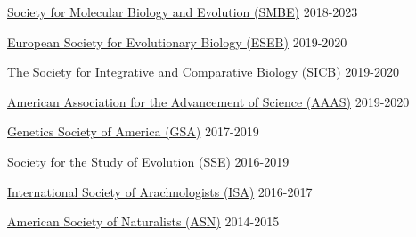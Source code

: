 

\begin{cvmemberships}

  \cvmembership
    {\href{https://smbe.org/}{Society for Molecular Biology and Evolution (SMBE)}} %
    {} %
    {2018-2023} %
    
  \cvmembership
    {\href{https://eseb.org/}{European Society for Evolutionary Biology (ESEB)}}
    {}
    {2019-2020}
  
  \cvmembership
    {\href{http://www.sicb.org/}{The Society for Integrative and Comparative Biology (SICB)}} %
    {}   %
    {2019-2020} %
    
  \cvmembership
    {\href{https://www.aaas.org/}{American Association for the Advancement of Science (AAAS)}} %
    {} %
    {2019-2020} %

  \cvmembership
    {\href{https://genetics-gsa.org/}{Genetics Society of America (GSA)}} %
    {} %
    {2017-2019} %

  \cvmembership
    {\href{https://www.evolutionsociety.org/}{Society for the Study of Evolution (SSE)}} %
    {} %
    {2016-2019} %

    
  \cvmembership
    {\href{https://arachnology.org/}{International Society of Arachnologists (ISA)}}
    {}
    {2016-2017}
    
  \cvmembership
     {\href{https://www.amnat.org/}{American Society of Naturalists (ASN)}}
     {}
     {2014-2015} 

\end{cvmemberships}
